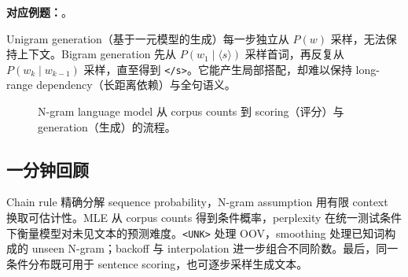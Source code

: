 \textbf{对应例题：}。


Unigram generation（基于一元模型的生成）每一步独立从 $P(w)$ 采样，无法保持上下文。Bigram generation 先从 $P(w_1\mid\langle s\rangle)$ 采样首词，再反复从 $P(w_k\mid w_{k-1})$ 采样，直至得到 \texttt{</s>}。它能产生局部搭配，却难以保持 long-range dependency（长距离依赖）与全句语义。

\begin{figure}[htbp]
  \centering
  \resizebox{0.92\textwidth}{!}{}
  \caption{N-gram language model 从 corpus counts 到 scoring（评分）与 generation（生成）的流程。}
  \label{fig:sc4002-l04-pipeline}
\end{figure}

\subsection{一分钟回顾}

Chain rule 精确分解 sequence probability，N-gram assumption 用有限 context 换取可估计性。MLE 从 corpus counts 得到条件概率，perplexity 在统一测试条件下衡量模型对未见文本的预测难度。\texttt{<UNK>} 处理 OOV，smoothing 处理已知词构成的 unseen N-gram；backoff 与 interpolation 进一步组合不同阶数。最后，同一条件分布既可用于 sentence scoring，也可逐步采样生成文本。
